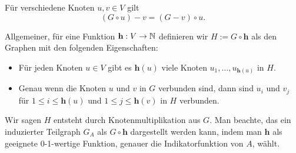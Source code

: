 \documentclass[../main.tex]{subfiles}
\begin{document}
Für verschiedene Knoten $u, v \in V$ gilt
\begin{equation*}
    (G \circ u) - v = (G - v) \circ u.
\end{equation*}

Allgemeiner, für eine Funktion $\mathbf h: V \to \mathbb{N}$ definieren wir $H := G \circ \mathbf h$ als den Graphen mit den folgenden Eigenschaften:

\begin{itemize}
    \item Für jeden Knoten $u \in V$ gibt es $\mathbf h(u)$ viele Knoten $u_1, \hdots, u_{\mathbf h(u)}$ in $H$.
    \item Genau wenn die Knoten $u$ und $v$ in $G$ verbunden sind, dann sind $u_i$ und $v_j$ für $1 \leq i \leq \mathbf h(u)$ und $1 \leq j \leq \mathbf h(v)$ in $H$ verbunden.
\end{itemize}

Wir sagen $H$ entsteht durch Knotenmultiplikation aus $G$. Man beachte, das ein induzierter Teilgraph $G_A$ als $G \circ \mathbf h$ dargestellt werden kann, indem man $\mathbf h$ als geeignete 0-1-wertige Funktion, genauer die Indikatorfunktion von $A$, wählt.
\end{document}
